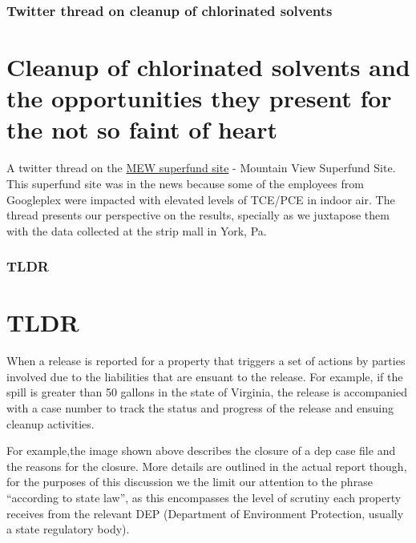 \documentclass{beamer}
\newcommand{\quotes}[1]{``#1''}
\begin{document}
\begin{frame}
\frametitle{Twitter thread on cleanup of chlorinated solvents}

\section{Cleanup of chlorinated solvents and the opportunities they present for the not so faint of heart}

A twitter thread on the \href{https://twitter.com/dganti1/status/1254433456462979078}{MEW superfund site} - Mountain View Superfund Site. This superfund site was in the news because some of the employees from Googleplex were impacted with elevated levels of TCE/PCE in indoor air. The thread presents our perspective on the results, specially as we juxtapose them with the data collected at the strip mall in York, Pa.

\end{frame}

\begin{frame}
\frametitle{TLDR}
\section{TLDR}
  When a release is reported for a property that triggers a set of actions by parties involved due to the liabilities that are ensuant to the release. For example, if the spill is greater than 50 gallons in the state of Virginia, the release is accompanied with a case number to track the status and progress of the release and ensuing cleanup activities.

  For example,the image shown above describes the closure of a dep case file and the reasons for the closure. More details are outlined in the actual report though, for the purposes of this discussion we the limit our attention to the phrase \quotes{according to state law}, as this encompasses the level of scrutiny each property receives from the relevant DEP (Department of Environment Protection, usually a state regulatory body). 

\end{frame}
\end{document}
